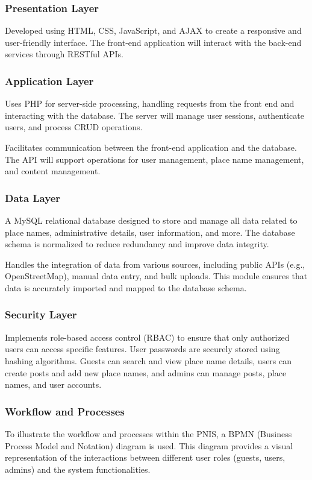 \subsubsection{Presentation Layer}
Developed using HTML, CSS, JavaScript, and AJAX to create a responsive and user-friendly interface. The front-end application will interact with the back-end services through RESTful APIs.

\subsubsection{Application Layer}
Uses PHP for server-side processing, handling requests from the front end and interacting with the database. The server will manage user sessions, authenticate users, and process CRUD operations.

Facilitates communication between the front-end application and the database. The API will support operations for user management, place name management, and content management.

\subsubsection{Data Layer}
A MySQL relational database designed to store and manage all data related to place names, administrative details, user information, and more. The database schema is normalized to reduce redundancy and improve data integrity.

Handles the integration of data from various sources, including public APIs (e.g., OpenStreetMap), manual data entry, and bulk uploads. This module ensures that data is accurately imported and mapped to the database schema.

\subsubsection{Security Layer}
Implements role-based access control (RBAC) to ensure that only authorized users can access specific features. User passwords are securely stored using hashing algorithms. Guests can search and view place name details, users can create posts and add new place names, and admins can manage posts, place names, and user accounts.

\subsubsection{Workflow and Processes}
To illustrate the workflow and processes within the PNIS, a BPMN (Business Process Model and Notation) diagram is used. This diagram provides a visual representation of the interactions between different user roles (guests, users, admins) and the system functionalities.

